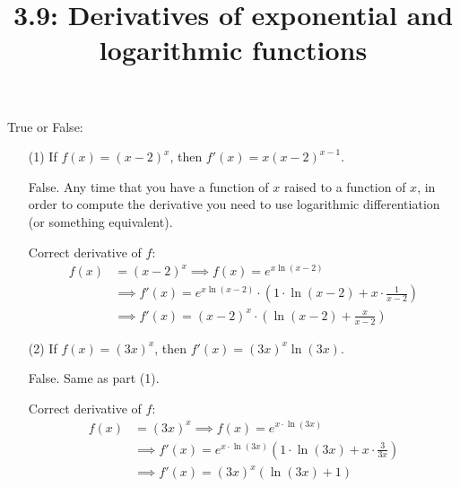 \documentclass[nooutcomes]{ximera}
\title{3.9: Derivatives of exponential and logarithmic functions}
\begin{document}
\begin{abstract}		\end{abstract}
\maketitle

\begin{problem}
  True or False:
  \begin{enumerate}
    \item[(1)]
      If $f(x) = (x-2)^x$, then $f'(x) = x (x-2)^{x-1}$.
      \begin{freeResponse}
        False.
        Any time that you have a function of $x$ raised to a function of $x$, in order to compute the derivative you need to use logarithmic differentiation (or something equivalent).

        Correct derivative of $f$:
        \begin{align*}
          f(x) &= (x-2)^x \implies f(x) = e^{x \ln(x-2)} \\
          &\implies f'(x) = e^{x \ln(x-2)} \cdot \left(1\cdot\ln(x-2) + x \cdot \frac{1}{x-2}\right) \\
          &\implies f'(x) = (x-2)^x \cdot \left(\ln(x-2) + \frac{x}{x-2}\right)
        \end{align*}
        \end{freeResponse}	
		
      \item[(2)]
        If $f(x) = (3x)^x$, then $f'(x) = (3x)^x \ln (3x)$.
	\begin{freeResponse}
          False.  Same as part (1).

          Correct derivative of $f$:
          \begin{align*}
            f(x) &= (3x)^x \implies f(x) = e^{x \cdot \ln(3x)} \\
            &\implies f'(x)  = e^{x \cdot \ln(3x)} \left(1 \cdot \ln(3x) + x \cdot \frac{3}{3x} \right) \\
            &\implies f'(x)  = (3x)^x \left(\ln(3x) + 1 \right)
          \end{align*}
	\end{freeResponse}	
	\end{enumerate}
\end{problem}
\end{document}
